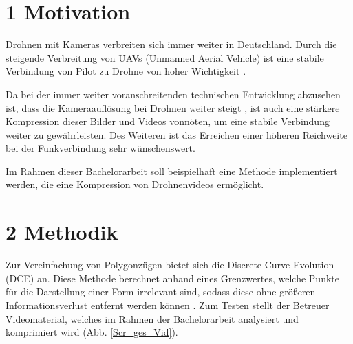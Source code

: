 \documentclass[a4paper,11pt,pdftex]{scrreport}
\begin{document}
\section*{1 Motivation}
Drohnen mit Kameras verbreiten sich immer weiter in Deutschland. Durch die steigende Verbreitung von UAVs (Unmanned Aerial Vehicle) ist eine stabile Verbindung von Pilot zu Drohne von hoher Wichtigkeit \citep{Nehring2021}. 

Da bei der immer weiter voranschreitenden technischen Entwicklung abzusehen ist, dass die Kameraauflösung bei Drohnen weiter steigt \citep{futuretech2017}, ist auch eine stärkere Kompression dieser Bilder und Videos vonnöten, um eine stabile Verbindung weiter zu gewährleisten. Des Weiteren ist das Erreichen einer höheren Reichweite bei der Funkverbindung sehr wünschenswert. 

Im Rahmen dieser Bachelorarbeit soll beispielhaft eine Methode implementiert werden, die eine Kompression von Drohnenvideos ermöglicht.





\section*{2 Methodik}
Zur Vereinfachung von Polygonzügen bietet sich die Discrete Curve Evolution (DCE) an. Diese Methode berechnet anhand eines Grenzwertes, welche Punkte für die Darstellung einer Form irrelevant sind, sodass diese ohne größeren Informationsverlust entfernt werden können \citep{Barkowsky2000}. Zum Testen stellt der Betreuer Videomaterial, welches im Rahmen der Bachelorarbeit analysiert und komprimiert wird (Abb. \ref{Scr_ges_Vid}). 
\end{document}
